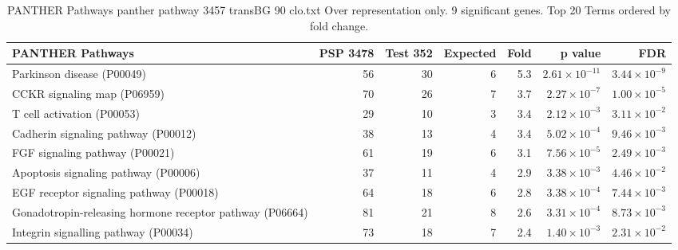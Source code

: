 \begin{table}[ht]
\centering
\begin{adjustbox}{width=\textwidth}
\begin{tabular}{lrrrrrr}
  \hline
PANTHER Pathways & PSP 3478 & Test 352 & Expected & Fold & p value & FDR \\ 
  \hline
Parkinson disease (P00049) & 56 & 30 & 6 & 5.3 & $2.61 \times 10^{-11}$ & $3.44 \times 10^{-9}$ \\ 
  CCKR signaling map (P06959) & 70 & 26 & 7 & 3.7 & $2.27 \times 10^{-7}$ & $1.00 \times 10^{-5}$ \\ 
  T cell activation (P00053) & 29 & 10 & 3 & 3.4 & $2.12 \times 10^{-3}$ & $3.11 \times 10^{-2}$ \\ 
  Cadherin signaling pathway (P00012) & 38 & 13 & 4 & 3.4 & $5.02 \times 10^{-4}$ & $9.46 \times 10^{-3}$ \\ 
  FGF signaling pathway (P00021) & 61 & 19 & 6 & 3.1 & $7.56 \times 10^{-5}$ & $2.49 \times 10^{-3}$ \\ 
  Apoptosis signaling pathway (P00006) & 37 & 11 & 4 & 2.9 & $3.38 \times 10^{-3}$ & $4.46 \times 10^{-2}$ \\ 
  EGF receptor signaling pathway (P00018) & 64 & 18 & 6 & 2.8 & $3.38 \times 10^{-4}$ & $7.44 \times 10^{-3}$ \\ 
  Gonadotropin-releasing hormone receptor pathway (P06664) & 81 & 21 & 8 & 2.6 & $3.31 \times 10^{-4}$ & $8.73 \times 10^{-3}$ \\ 
  Integrin signalling pathway (P00034) & 73 & 18 & 7 & 2.4 & $1.40 \times 10^{-3}$ & $2.31 \times 10^{-2}$ \\ 
   \hline
\end{tabular}
\end{adjustbox}
\caption{PANTHER Pathways panther pathway 3457 transBG 90 clo.txt Over representation only. 9 significant genes. Top 20 Terms ordered by fold change. } 
\label{tab:PANTHER Pathways panther pathway 3457 transBG 90 clo.txt Over representation only. 9 significant genes. Top 20 Terms ordered by fold change. }
\end{table}


